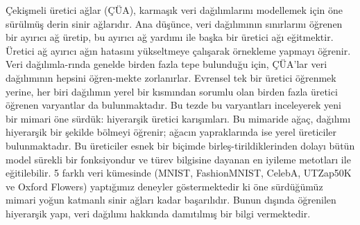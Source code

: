 \documentclass[a4paper,onesided,12pt]{report}
\begin{document}
\begin{ozet}
Çekişmeli üretici ağlar (ÇÜA), karmaşık veri dağılımlarını modellemek için öne sürülmüş derin sinir ağlarıdır. Ana düşünce, veri dağılımının sınırlarını öğrenen bir ayırıcı ağ üretip, bu ayırıcı ağ yardımı ile başka bir üretici ağı eğitmektir. Üretici ağ ayırıcı ağın hatasını yükseltmeye çalışarak örnekleme yapmayı öğrenir. Veri dağılımla-rında genelde birden fazla tepe bulunduğu için, ÇÜA'lar veri dağılımının hepsini öğren-mekte zorlanırlar. Evrensel tek bir üretici öğrenmek yerine, her biri dağılımın yerel bir kısmından sorumlu olan birden fazla üretici öğrenen varyantlar da bulunmaktadır. Bu tezde bu varyantları inceleyerek yeni bir mimari öne sürdük: hiyerarşik üretici karışımları. Bu mimaride ağaç, dağılımı hiyerarşik bir şekilde bölmeyi öğrenir; ağacın yapraklarında ise yerel üreticiler bulunmaktadır. Bu üreticiler esnek bir biçimde birleş-tirildiklerinden dolayı bütün model sürekli bir fonksiyondur ve türev bilgisine dayanan en iyileme metotları ile eğitilebilir. 5 farklı veri kümesinde (MNIST, FashionMNIST, CelebA, UTZap50K ve Oxford Flowers) yaptığımız deneyler göstermektedir ki öne sürdüğümüz mimari yoğun katmanlı sinir ağları kadar başarılıdır. Bunun dışında öğrenilen hiyerarşik yapı, veri dağılımı hakkında damıtılmış bir bilgi vermektedir.

\end{ozet}
\tableofcontents
\listoffigures
\listoftables
\begin{symbols}

\end{symbols}
\end{document}
